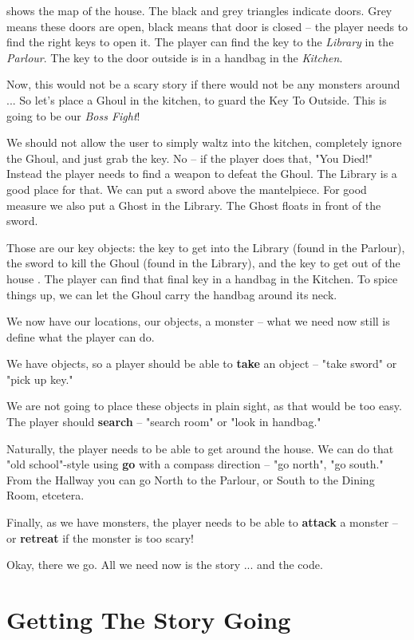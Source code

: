  shows the map of the house. The black and grey triangles indicate doors. Grey means these doors are open, black means that door is closed -- the player needs to find the right keys to open it. The player can find the key to the \emph{Library} in the \emph{Parlour}. The key to the door outside is in a handbag in the \emph{Kitchen}. 

Now, this would not be a scary story if there would not be any monsters around ... So let's place a Ghoul in the kitchen, to guard the Key To Outside. This is going to be our \emph{Boss Fight}! 

We should not allow the user to simply waltz into the kitchen, completely ignore the Ghoul, and just grab the key. No -- if the player does that, "You Died!" Instead the player needs to find a weapon to defeat the Ghoul. The Library is a good place for that. We can put a sword above the mantelpiece. For good measure we also put a Ghost in the Library. The Ghost floats in front of the sword. 

Those are our key objects: the key to get into the Library (found in the Parlour), the sword to kill the Ghoul (found in the Library), and the key to get out of the house . The player can find that final key in a handbag in the Kitchen. To spice things up, we can let the Ghoul carry the handbag around its neck.  

We now have our locations, our objects, a monster -- what we need now still is define what the player can do. 

We have objects, so a player should be able to \textbf{take} an object -- "take sword" or "pick up key." 

We are not going to place these objects in plain sight, as that would be too easy. The player should \textbf{search} -- "search room" or "look in handbag." 

Naturally, the player needs to be able to get around the house. We can do that "old school"-style using \textbf{go} with a compass direction -- "go north", "go south." From the Hallway you can go North to the Parlour, or South to the Dining Room, etcetera. 

Finally, as we have monsters, the player needs to be able to \textbf{attack} a monster -- or \textbf{retreat} if the monster is too scary! 

Okay, there we go. All we need now is the story ... and the code. 

\section{Getting The Story Going} 

